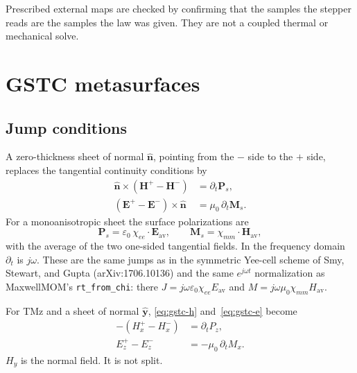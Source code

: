 \documentclass[11pt,a4paper]{article}
\numberwithin{equation}{section}
\begin{document}
Prescribed external maps are checked by confirming that the samples the
stepper reads are the samples the law was given. They are not a coupled
thermal or mechanical solve.

\section{GSTC metasurfaces}
\label{sec:gstc}

\subsection{Jump conditions}
\label{sec:jumps}

A zero-thickness sheet of normal $\hat{\mathbf{n}}$, pointing from the $-$
side to the $+$ side, replaces the tangential continuity conditions by
\begin{align}
\hat{\mathbf{n}}\times(\mathbf{H}^+-\mathbf{H}^-) &= \partial_t\mathbf{P}_s,
\label{eq:gstc-h}\\
(\mathbf{E}^+-\mathbf{E}^-)\times\hat{\mathbf{n}} &= \mu_0\,\partial_t\mathbf{M}_s.
\label{eq:gstc-e}
\end{align}
For a monoanisotropic sheet the surface polarizations are
\begin{equation}
\mathbf{P}_s = \varepsilon_0\,\chi_{ee}\cdot\mathbf{E}_{\mathrm{av}},
\qquad
\mathbf{M}_s = \chi_{mm}\cdot\mathbf{H}_{\mathrm{av}},
\label{eq:pol}
\end{equation}
with the average of the two one-sided tangential fields. In the frequency
domain $\partial_t$ is $j\omega$. These are the same jumps as in the symmetric
Yee-cell scheme of Smy, Stewart, and Gupta (arXiv:1706.10136) and the same
$e^{j\omega t}$ normalization as MaxwellMOM's \texttt{rt\_from\_chi}: there
$J=j\omega\varepsilon_0\chi_{ee}E_{\mathrm{av}}$ and
$M=j\omega\mu_0\chi_{mm}H_{\mathrm{av}}$.

For TMz and a sheet of normal $\hat{\mathbf{y}}$, \eqref{eq:gstc-h}
and~\eqref{eq:gstc-e} become
\begin{align}
-(H_x^+ - H_x^-) &= \partial_t P_z, \label{eq:jump-hx}\\
E_z^+ - E_z^- &= -\mu_0\,\partial_t M_x. \label{eq:jump-ez}
\end{align}
$H_y$ is the normal field. It is not split.
\end{document}
